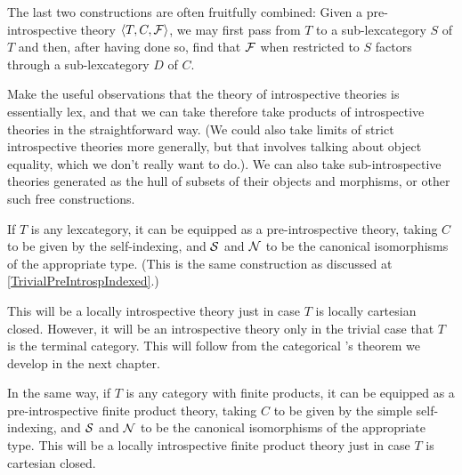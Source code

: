 The last two constructions are often fruitfully combined: Given a pre-introspective theory $\langle T, C, \mathcal{F} \rangle$, we may first pass from $T$ to a sub-lexcategory $S$ of $T$ and then, after having done so, find that $\mathcal{F}$ when restricted to $S$ factors through a sub-lexcategory $D$ of $C$.

\begin{TODOblock}
Make the useful observations that the theory of introspective theories is essentially lex, and that we can take therefore take products of introspective theories in the straightforward way. (We could also take limits of strict introspective theories more generally, but that involves talking about object equality, which we don't really want to do.). We can also take sub-introspective theories generated as the hull of subsets of their objects and morphisms, or other such free constructions.
\end{TODOblock}

\begin{construction}\label{TrivialPreIntrosp}
If $T$ is any lexcategory, it can be equipped as a pre-introspective theory, taking $C$ to be given by the self-indexing, and $\mathcal{S}$ and $\mathcal{N}$ to be the canonical isomorphisms of the appropriate type. (This is the same construction as discussed at \cref{TrivialPreIntrospIndexed}.)

This will be a locally introspective theory just in case $T$ is locally cartesian closed. However, it will be an introspective theory only in the trivial case that $T$ is the terminal category. This will follow from the categorical \Loeb's theorem we develop in the next chapter.

In the same way, if $T$ is any category with finite products, it can be equipped as a pre-introspective finite product theory, taking $C$ to be given by the simple self-indexing, and $\mathcal{S}$ and $\mathcal{N}$ to be the canonical isomorphisms of the appropriate type. This will be a locally introspective finite product theory just in case $T$ is cartesian closed.

\end{construction}

